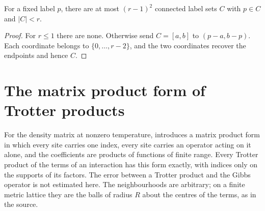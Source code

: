 \begin{lemma}
    \label{thm:physical_cluster_crossing_count}
    \leanok
    For a fixed label $p$, there are at most $(r-1)^2$ connected
    label sets $C$ with $p\in C$ and $|C|<r$.
\end{lemma}
\begin{proof}\leanok
    For $r\leq1$ there are none. Otherwise send $C=[a,b]$ to
    $(p-a,b-p)$. Each coordinate belongs to $\{0,\ldots,r-2\}$,
    and the two coordinates recover the endpoints and hence $C$.
\end{proof}

\section{The matrix product form of Trotter products}
\label{sec:hastings_product_form}


For the density matrix at nonzero temperature, \cite[lines
    1024--1079]{Hastings2006Solving} introduces a matrix product form in which
every site carries one index, every site carries an operator acting on it
alone, and the coefficients are products of functions of finite range. Every
Trotter product of the terms of an interaction has this form exactly, with
indices only on the supports of its factors. The error between a Trotter
product and the Gibbs operator is not estimated here. The neighbourhoods are
arbitrary; on a finite metric lattice they are the balls of radius $R$ about
the centres of the terms, as in the source.

